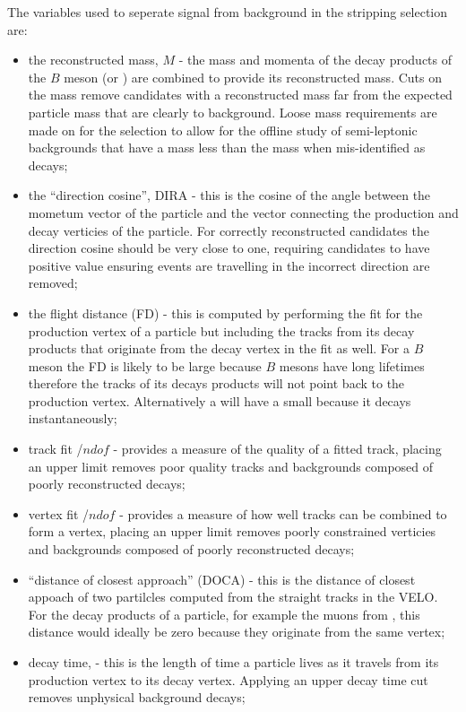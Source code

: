 The variables used to seperate signal from background in the stripping selection are:
\begin{itemize}
\item the reconstructed mass, $M$ - the mass and momenta of the decay products of the $B$ meson (or \jpsi) are combined to provide its reconstructed mass. Cuts on the mass remove candidates with a reconstructed mass far from the expected particle mass that are clearly to background. Loose mass requirements are made on for the \bsmumu selection to allow for the offline study of semi-leptonic backgrounds that have a mass less than the \bs mass when mis-identified as \bsmumu decays;
\item the ``direction cosine'', DIRA - this is the cosine of the angle between the mometum vector of the particle and the vector connecting the production and decay verticies of the particle. For correctly reconstructed candidates the direction cosine should be very close to one, requiring candidates to have positive value ensuring events are travelling in the incorrect direction are removed;
\item the flight distance (FD) \chisqd - this is computed by performing the fit for the production vertex of a particle but including the tracks from its decay products that originate from the decay vertex in the fit as well. For a $B$ meson the FD \chisqd is likely to be large because $B$ mesons have long lifetimes therefore the tracks of its decays products will not point back to the production vertex. Alternatively a \jpsi will have a small \chisqd because it decays instantaneously;
\item track fit \chisqd/$ndof$ - provides a measure of the quality of a fitted track, placing an upper limit removes poor quality tracks and backgrounds composed of poorly reconstructed decays;
\item vertex fit \chisqd/$ndof$ - provides a measure of how well tracks can be combined to form a vertex, placing an upper limit removes poorly constrained verticies and backgrounds composed of poorly reconstructed decays;
\item ``distance of closest approach'' (DOCA) - this is the distance of closest appoach of two partilcles computed from the straight tracks in the VELO. For the decay products of a particle, for example the muons from \bsmumu, this distance would ideally be zero because they originate from the same vertex;
\item decay time, \lt - this is the length of time a particle lives as it travels from its production vertex to its decay vertex. Applying an upper decay time cut removes unphysical background decays;

\end{itemize}
